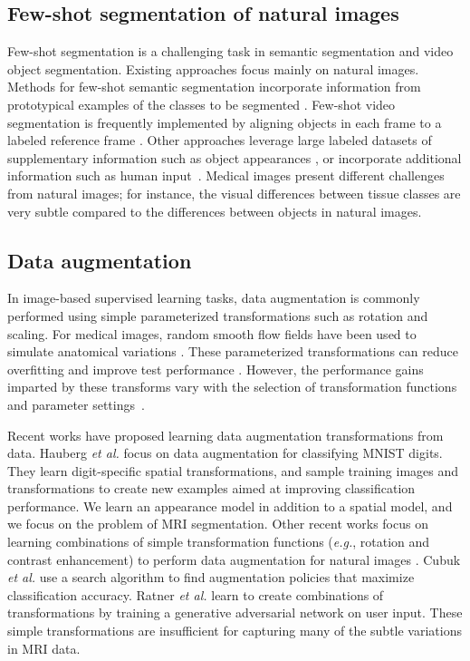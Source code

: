 \documentclass[10pt,twocolumn,letterpaper]{article}
\begin{document}
\subsection{Few-shot segmentation of natural images}
Few-shot segmentation is a challenging task in semantic segmentation and video object segmentation. Existing approaches focus mainly on natural images. Methods for few-shot semantic segmentation incorporate information from prototypical examples of the classes to be segmented \cite{dong2018few,shaban2017one}. Few-shot video segmentation is frequently implemented by aligning objects in each frame to a labeled reference frame \cite{jain2017fusionseg, tsai2016video}. Other approaches leverage large labeled datasets of supplementary information such as object appearances \cite{caelles2017one}, or incorporate additional information such as human input~\cite{rakelly2018few}. Medical images present different challenges from natural images; for instance, the visual differences between tissue classes are very subtle compared to the differences between objects in natural images.

\subsection{Data augmentation}
In image-based supervised learning tasks, data augmentation is commonly performed using simple parameterized transformations such as rotation and scaling. For medical images, random smooth flow fields have been used to simulate anatomical variations \cite{milletari2016v,ronneberger2015u,roth2015anatomy}. These parameterized transformations can reduce overfitting and improve test performance \cite{huang2016densely,krizhevsky2012imagenet,milletari2016v,ronneberger2015u,roth2015anatomy}. However, the performance gains imparted by these transforms vary with the selection of transformation functions and parameter settings~\cite{dosovitskiy2016discriminative}. 

Recent works have proposed learning data augmentation transformations from data. Hauberg \textit{et al.} \cite{hauberg2016dreaming} focus on data augmentation for classifying MNIST digits. They learn digit-specific spatial transformations, and sample training images and transformations to create new examples aimed at improving classification performance. We learn an appearance model in addition to a spatial model, and we focus on the problem of MRI segmentation. 
Other recent works focus on learning combinations of simple transformation functions (\textit{e.g.}, rotation and contrast enhancement) to perform data augmentation for natural images \cite{cubuk2018autoaugment,ratner2017learning}. Cubuk \textit{et al.} \cite{cubuk2018autoaugment} use a search algorithm to find augmentation policies that maximize classification accuracy. Ratner \textit{et al.} \cite{ratner2017learning} learn to create combinations of transformations by training a generative adversarial network on user input. These simple transformations are insufficient for capturing many of the subtle variations in MRI data. 
\end{document}
